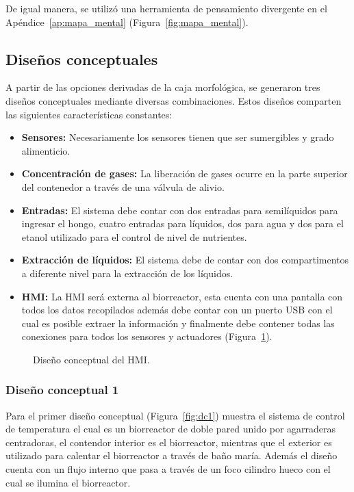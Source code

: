 \documentclass[11pt,tesis,twoside,openright,spanish]{upiiztt}
\begin{document}
De igual manera, se utilizó una herramienta de pensamiento divergente en el Apéndice~\ref{ap:mapa_mental} (Figura~\ref{fig:mapa_mental}).

\subsection{Diseños conceptuales}

A partir de las opciones derivadas de la caja morfológica, se generaron tres diseños
conceptuales mediante diversas combinaciones. Estos diseños comparten las
siguientes características constantes:

\begin{itemize}
  \item \textbf{Sensores:} Necesariamente los sensores tienen que ser sumergibles y grado alimenticio.
  \item \textbf{Concentración de gases:} La liberación de gases ocurre en la parte superior del contenedor a través de una válvula de alivio.
  \item \textbf{Entradas:} El sistema debe contar con dos entradas para semilíquidos para ingresar el hongo, cuatro entradas para líquidos, dos para agua y dos para el etanol utilizado para el control de nivel de nutrientes.
  \item \textbf{Extracción de líquidos:} El sistema debe de contar con dos compartimentos a diferente nivel para la extracción de los líquidos.
  \item \textbf{HMI:} La HMI será externa al biorreactor, esta cuenta con una pantalla con todos los datos recopilados además debe contar con un puerto USB con el cual es posible extraer la información y finalmente debe contener todas las conexiones para todos los sensores y actuadores (Figura~\ref{fig:hmi_conceptual}).
\end{itemize}

\begin{figure}[H]
  \centering
  \caption{Diseño conceptual del HMI.}
  \label{fig:hmi_conceptual}
\end{figure}

\subsubsection{Diseño conceptual 1}

Para el primer diseño conceptual (Figura~\ref{fig:dc1}) muestra el sistema de control de
temperatura el cual es un biorreactor de doble pared unido por agarraderas
centradoras, el contendor interior es el biorreactor, mientras que el exterior es
utilizado para calentar el biorreactor a través de baño maría. Además el diseño
cuenta con un flujo interno que pasa a través de un foco cilindro hueco con el cual
se ilumina el biorreactor.
\end{document}
